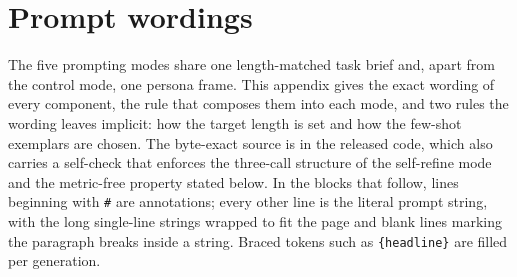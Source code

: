 \documentclass{article}
\begin{document}
\appendix

\section{Prompt wordings}
\label{sec:prompts}

The five prompting modes share one length-matched task brief and, apart from the control mode,
one persona frame. This appendix gives the exact wording of every component, the rule that
composes them into each mode, and two rules the wording leaves implicit: how the target length is
set and how the few-shot exemplars are chosen. The byte-exact source is 
in the released code, which also carries a self-check that enforces the three-call structure of
the self-refine mode and the metric-free property stated below. In the blocks that follow, lines
beginning with \texttt{\#} are annotations; every other line is the literal prompt string, with
the long single-line strings wrapped to fit the page and blank lines marking the paragraph breaks
inside a string. Braced tokens such as \texttt{\{headline\}} are filled per generation.
\end{document}
